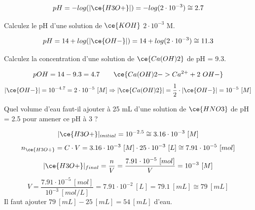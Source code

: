 \documentclass[
  11pt,
  french,
  a4paper,
  openany]{book}
\begin{document}
\begin{Answer}
\[
pH = - log(|\ce{H3O+}|) = - log(2 \cdot 10^{-3}) \cong 2.7
\]

\end{Answer}

\begin{Exercise}
Calculez le pH d'une solution de \(\ce{KOH}\) \(2 \cdot 10^{-3}\) M.

\end{Exercise}

\begin{Answer}
\[
pH = 14 + log(|\ce{OH-}|) = 14 + log(2 \cdot 10^{-3}) \cong 11.3
\]

\end{Answer}

\clearpage

\begin{Exercise}
Calculez la concentration d'une solution de \(\ce{Ca(OH)2}\) de pH = 9.3.

\end{Exercise}

\begin{Answer}
\[
\begin{split}
pOH = 14 - 9.3 = 4.7
\end{split}
\qquad
\begin{split}
\ce{Ca(OH)2 -> Ca^{2+} + 2\ OH-}
\end{split}
\]
\[
|\ce{OH-}| = 10^{-4.7} = 2 \cdot 10^{-5}\ [M] \Rightarrow |\ce{Ca(OH)2}| = \frac{1}{2} \cdot |\ce{OH-}| = 10^{-5}\ [M]
\]

\end{Answer}

\begin{Exercise}
Quel volume d'eau faut-il ajouter à 25 mL d'une solution de \(\ce{HNO3}\) de pH = 2.5 pour amener ce pH à 3 ?

\end{Exercise}

\begin{Answer}
\[
|\ce{H3O+}|_{initial} = 10^{-2.5} \cong 3.16 \cdot 10^{-3}\ [M]
\]
\[
n_{\ce{H3O+}} = C \cdot V = 3.16 \cdot 10^{-3}\ [M] \cdot 25 \cdot 10^{-3}\ [L] \cong 7.91 \cdot 10^{-5}\ [mol]
\]
\[
|\ce{H3O+}|_{final} = \frac{n}{V} = \frac{7.91 \cdot 10^{-5}\ [mol]}{V} = 10^{-3}\ [M]
\]
\[
V = \frac{7.91 \cdot 10^{-5}\ [mol]}{10^{-3}\ [mol/L]} = 7.91 \cdot 10^{-2}\ [L] = 79.1\ [mL] \cong 79\ [mL]
\]
Il faut ajouter \(79\ [mL] - 25\ [mL] = 54\ [mL]\) d'eau.

\end{Answer}
\end{document}
